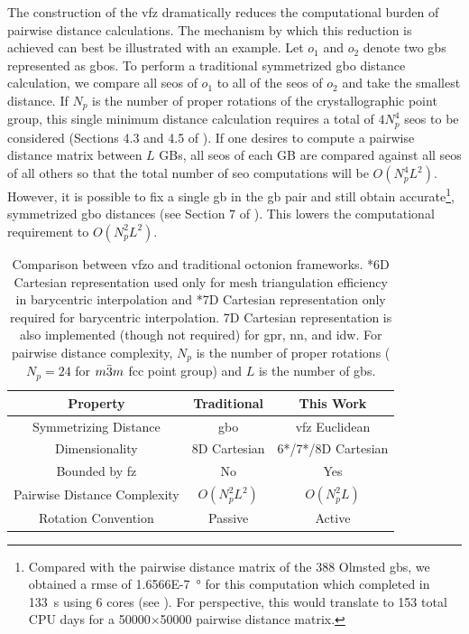 \documentclass[final,twocolumn,12pt]{elsarticle}
\begin{document}
The construction of the \gls{vfz} dramatically reduces the computational burden of pairwise distance calculations. The mechanism by which this reduction is achieved can best be illustrated with an example. Let $o_1$ and $o_2$ denote two \glspl{gb} represented as \glspl{gbo}. 
To perform a traditional symmetrized \gls{gbo} distance calculation, we compare all \glspl{seo} of $o_1$ to all of the \glspl{seo} of $o_2$ and take the smallest distance. If $N_p$ is the number of proper rotations of the crystallographic point group, this single minimum distance calculation requires a total of $4N_p^4$ \glspl{seo} to be considered (Sections 4.3 and 4.5 of \citet{francisGeodesicOctonionMetric2019}). If one desires to compute a pairwise distance matrix between $L$ GBs, all \glspl{seo} of each GB are compared against all \glspl{seo} of all others so that the total number of \gls{seo} computations will be $O(N_p^4L^2)$. However, it is possible to fix a single \gls{gb} in the \gls{gb} pair and still obtain accurate\footnote{Compared with the pairwise distance matrix of the 388 Olmsted \glspl{gb}, we obtained a \gls{rmse} of \SI{1.6566E-7}{\degree} for this computation which completed in \SI{133}{\s} using 6 cores (see ). For perspective, this would translate to 153 total CPU days for a \num{50000}$\times$\num{50000} pairwise distance matrix.}, symmetrized \gls{gbo} distances (see Section 7 of \citet{morawiecDistancesGrainInterfaces2019}). This lowers the computational requirement to $O(N_p^2L^2)$.
\begin{table}
\caption{Comparison between \acrlong{vfzo} and traditional octonion frameworks. *6D Cartesian representation used only for mesh triangulation efficiency in barycentric interpolation and *7D Cartesian representation only required for barycentric interpolation. 7D Cartesian representation is also implemented (though not required) for \gls{gpr}, \gls{nn}, and \gls{idw}. For pairwise distance complexity, $N_p$ is the number of proper rotations ($N_p=24$ for $m\Bar{3}m$ \gls{fcc} point group) and $L$ is the number of \glspl{gb}.}
\centering
\begin{tabular}{ccc}
\toprule
Property & Traditional & This Work \\
\midrule
Symmetrizing Distance & \gls{gbo} & \gls{vfz} Euclidean \\
Dimensionality & 8D Cartesian & 6*/7*/8D Cartesian \\
Bounded by \gls{fz} & No & Yes \\
Pairwise Distance Complexity & $O(N_p^2L^2)$ & $O(N_p^2L)$ \\
Rotation Convention & Passive & Active \\
\bottomrule
\end{tabular}
\label{tab:closed-mesh-comparison}
\end{table}
\end{document}
